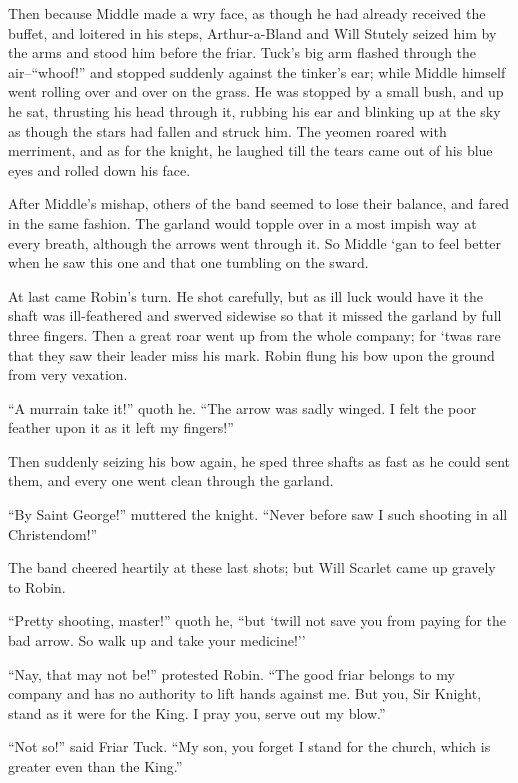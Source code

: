 Then because Middle made a wry face, as though he had already received
the buffet, and loitered in his steps, Arthur-a-Bland and Will Stutely
seized him by the arms and stood him before the friar. Tuck's big arm
flashed through the air--``whoof!'' and stopped suddenly against the
tinker's ear; while Middle himself went rolling over and over on the
grass. He was stopped by a small bush, and up he sat, thrusting his head
through it, rubbing his ear and blinking up at the sky as though the
stars had fallen and struck him. The yeomen roared with merriment, and
as for the knight, he laughed till the tears came out of his blue eyes
and rolled down his face.

After Middle's mishap, others of the band seemed to lose their balance,
and fared in the same fashion. The garland would topple over in a most
impish way at every breath, although the arrows went through it. So
Middle `gan to feel better when he saw this one and that one tumbling on
the sward.

At last came Robin's turn. He shot carefully, but as ill luck would have
it the shaft was ill-feathered and swerved sidewise so that it missed
the garland by full three fingers. Then a great roar went up from the
whole company; for `twas rare that they saw their leader miss his mark.
Robin flung his bow upon the ground from very vexation.

``A murrain take it!'' quoth he. ``The arrow was sadly winged. I felt
the poor feather upon it as it left my fingers!''

Then suddenly seizing his bow again, he sped three shafts as fast as he
could sent them, and every one went clean through the garland.

``By Saint George!'' muttered the knight. ``Never before saw I such
shooting in all Christendom!''

The band cheered heartily at these last shots; but Will Scarlet came up
gravely to Robin.

``Pretty shooting, master!'' quoth he, ``but `twill not save you from
paying for the bad arrow. So walk up and take your medicine!''

``Nay, that may not be!'' protested Robin. ``The good friar belongs to
my company and has no authority to lift hands against me. But you, Sir
Knight, stand as it were for the King. I pray you, serve out my blow.''

``Not so!'' said Friar Tuck. ``My son, you forget I stand for the
church, which is greater even than the King.''

